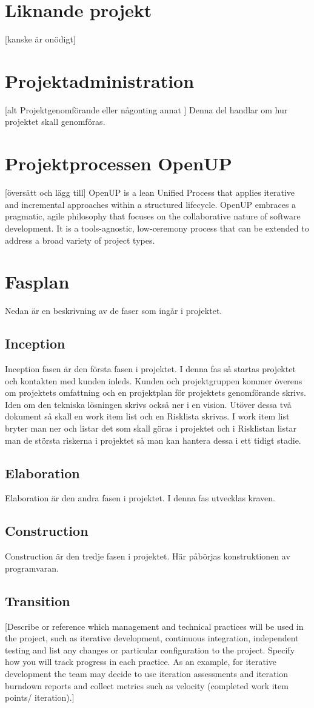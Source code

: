 \section{Liknande projekt}
[kanske är onödigt]
\section{Projektadministration}
[alt Projektgenomförande eller någonting annat ]
Denna del handlar om hur projektet skall genomföras.
\section{Projektprocessen OpenUP}
[översätt och lägg till]
OpenUP is a lean Unified Process that applies iterative and incremental approaches within a structured lifecycle. OpenUP embraces a pragmatic, agile philosophy that focuses on the collaborative nature of software development. It is a tools-agnostic, low-ceremony process that can be extended to address a broad variety of project types.
\section{Fasplan}
Nedan är en beskrivning av de faser som ingår i projektet.
\subsection*{Inception}
Inception fasen är den första fasen i projektet. I denna fas så startas projektet och kontakten med kunden inleds. Kunden och projektgruppen kommer överens om projektets omfattning och en projektplan för projektets genomförande skrivs. Iden om den tekniska lösningen skrivs också ner i en vision. Utöver dessa två dokument så skall en work item list och en Risklista skrivas. I work item list bryter man ner och listar det som skall göras i projektet och i Risklistan listar man de största riskerna i projektet så man kan hantera dessa i ett tidigt stadie.
\subsection*{Elaboration}
Elaboration är den andra fasen i projektet. I denna fas utvecklas kraven.
\subsection*{Construction}
Construction är den tredje fasen i projektet. Här påbörjas konstruktionen av programvaran.
\subsection*{Transition}
[Describe or reference which management and technical practices will be used in the project, such as iterative development, continuous integration, independent testing and list any changes or particular configuration to the project. Specify how you will track progress in each practice. As an example, for iterative development the team may decide to use iteration assessments and iteration burndown reports and collect metrics such as velocity (completed work item points/ iteration).]
